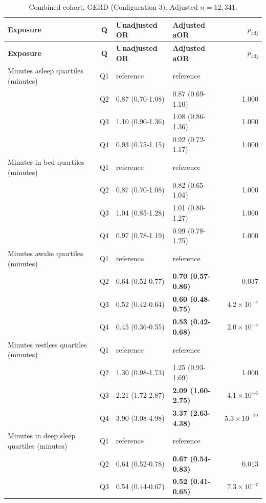\documentclass[11pt]{article}
\begin{document}
\begin{longtable}{@{}p{5.2cm}c p{3.0cm} p{3.0cm} r@{}}
\caption{Combined cohort, GERD (Configuration 3). Adjusted $n=12{,}341$.}\label{tab:res-comb-gerd}\\
\toprule \textbf{Exposure} & \textbf{Q} & \textbf{Unadjusted OR} & \textbf{Adjusted aOR} & \textbf{$p_{\text{adj}}$} \\ \midrule
\endfirsthead \toprule \textbf{Exposure} & \textbf{Q} & \textbf{Unadjusted OR} & \textbf{Adjusted aOR} & \textbf{$p_{\text{adj}}$} \\ \midrule \endhead
Minutes asleep quartiles (minutes) & Q1 & reference & reference & \\
 & Q2 & 0.87 (0.70-1.08) & 0.87 (0.69-1.10) & 1.000 \\
 & Q3 & 1.10 (0.90-1.36) & 1.08 (0.86-1.36) & 1.000 \\
 & Q4 & 0.93 (0.75-1.15) & 0.92 (0.72-1.17) & 1.000 \\
\addlinespace
Minutes in bed quartiles (minutes) & Q1 & reference & reference & \\
 & Q2 & 0.87 (0.70-1.08) & 0.82 (0.65-1.04) & 1.000 \\
 & Q3 & 1.04 (0.85-1.28) & 1.01 (0.80-1.27) & 1.000 \\
 & Q4 & 0.97 (0.78-1.19) & 0.99 (0.78-1.25) & 1.000 \\
\addlinespace
Minutes awake quartiles (minutes) & Q1 & reference & reference & \\
 & Q2 & 0.64 (0.52-0.77) & \textbf{0.70 (0.57-0.86)} & 0.037 \\
 & Q3 & 0.52 (0.42-0.64) & \textbf{0.60 (0.48-0.75)} & $4.2\times10^{-4}$ \\
 & Q4 & 0.45 (0.36-0.55) & \textbf{0.53 (0.42-0.68)} & $2.0\times10^{-5}$ \\
\addlinespace
Minutes restless quartiles (minutes) & Q1 & reference & reference & \\
 & Q2 & 1.30 (0.98-1.73) & 1.25 (0.93-1.69) & 1.000 \\
 & Q3 & 2.21 (1.72-2.87) & \textbf{2.09 (1.60-2.75)} & $4.1\times10^{-6}$ \\
 & Q4 & 3.90 (3.08-4.98) & \textbf{3.37 (2.63-4.38)} & $5.3\times10^{-19}$ \\
\addlinespace
Minutes in deep sleep quartiles (minutes) & Q1 & reference & reference & \\
 & Q2 & 0.64 (0.52-0.78) & \textbf{0.67 (0.54-0.83)} & 0.013 \\
 & Q3 & 0.54 (0.44-0.67) & \textbf{0.52 (0.41-0.65)} & $7.3\times10^{-7}$ \\

\end{longtable}
\end{document}

